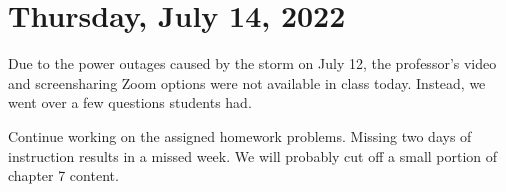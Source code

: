 \section{Thursday, July 14, 2022}
Due to the power outages caused by the storm on July 12, the professor's video and screensharing Zoom options were not available in class today. Instead, we went over a few questions students had.

Continue working on the assigned homework problems. Missing two days of instruction results in a missed week. We will probably cut off a small portion of chapter 7 content.